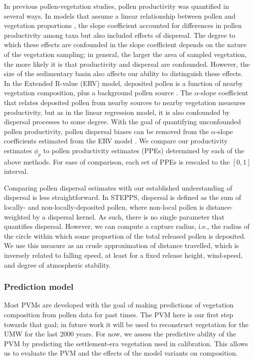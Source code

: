 \documentclass[12pt]{article}
\begin{document}
In previous pollen-vegetation studies, pollen productivity was
quantified in several ways. In models that assume a linear
relationship between pollen and vegetation proportions
\citep{webb1981estimating, bradshaw1985relationships, jackson1990},
the slope coefficient accounted for differences in pollen productivity
among taxa but also included effects of dispersal. The degree to which
these effects are confounded in the slope coefficient depends on the
nature of the vegetation sampling; in general, the larger the area of
sampled vegetation, the more likely it is that productivity and
dispersal are confounded. However, the size of the sedimentary basin
also affects our ability to distinguish these effects. In the Extended
R-value (ERV) model, deposited pollen is a function of nearby
vegetation composition, plus a background pollen source
\citep{prentice1986, prentice1987quantitative, marquer2014holocene,
  brostrom2008pollen}. The $\alpha$-slope coefficient that relates
deposited pollen from nearby sources to nearby vegetation measures
productivity, but as in the linear regression model, it is also
confounded by dispersal processes to some degree. With the goal of
quantifying unconfounded pollen productivity, pollen dispersal biases
can be removed from the $\alpha$-slope coefficients estimated from the
ERV model \citep{sugita1999landscape}. We compare our productivity
estimates $\phi_p$ to pollen productivity estimates (PPEs) determined
by each of the above methods. For ease of comparison, each set of PPEs
is rescaled to the $[0,1]$ interval.

Comparing pollen dispersal estimates with our established
understanding of dispersal is less straightforward. In STEPPS,
dispersal is defined as the sum of locally- and non-locally-deposited
pollen, where non-local pollen is distance-weighted by a dispersal
kernel. As such, there is no single parameter that quantifies
dispersal. However, we can compute a capture radius, i.e., the radius
of the circle within which some proportion of the total released
pollen is deposited. We use this measure as an crude approximation of
distance travelled, which is inversely related to falling speed, at
least for a fixed release height, wind-speed, and degree of
atmospheric stability.

\subsubsection{Prediction model}
\label{sec:pred}

Most PVMs are developed with the goal of making predictions of
vegetation composition from pollen data for past times. The PVM here
is our first step towards that goal; in future work it will be used to
reconstruct vegetation for the UMW for the last 2000 years. For now,
we assess the predictive ability of the PVM by predicting the
settlement-era vegetation used in calibration. This allows us to
evaluate the PVM and the effects of the model variants on composition.
\end{document}
